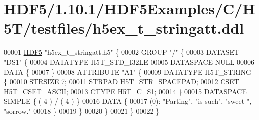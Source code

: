 \hypertarget{_h_d_f5_21_810_81_2_h_d_f5_examples_2_c_2_h5_t_2testfiles_2h5ex__t__stringatt_8ddl_source}{}\section{H\+D\+F5/1.10.1/\+H\+D\+F5\+Examples/\+C/\+H5\+T/testfiles/h5ex\+\_\+t\+\_\+stringatt.ddl}
\label{_h_d_f5_21_810_81_2_h_d_f5_examples_2_c_2_h5_t_2testfiles_2h5ex__t__stringatt_8ddl_source}

\begin{DoxyCode}
00001 \hyperlink{namespace_h_d_f5}{HDF5} \textcolor{stringliteral}{"h5ex\_t\_stringatt.h5"} \{
00002 GROUP \textcolor{stringliteral}{"/"} \{
00003    DATASET \textcolor{stringliteral}{"DS1"} \{
00004       DATATYPE  H5T\_STD\_I32LE
00005       DATASPACE  NULL
00006       DATA \{
00007       \}
00008       ATTRIBUTE \textcolor{stringliteral}{"A1"} \{
00009          DATATYPE  H5T\_STRING \{
00010             STRSIZE 7;
00011             STRPAD H5T\_STR\_SPACEPAD;
00012             CSET H5T\_CSET\_ASCII;
00013             CTYPE H5T\_C\_S1;
00014          \}
00015          DATASPACE  SIMPLE \{ ( 4 ) / ( 4 ) \}
00016          DATA \{
00017          (0): \textcolor{stringliteral}{"Parting"}, \textcolor{stringliteral}{"is such"}, \textcolor{stringliteral}{"sweet  "}, \textcolor{stringliteral}{"sorrow."}
00018          \}
00019       \}
00020    \}
00021 \}
00022 \}
\end{DoxyCode}

